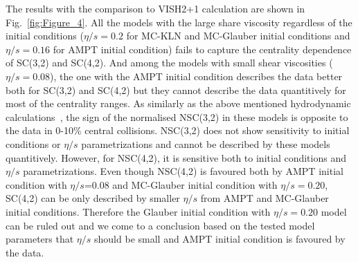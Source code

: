\documentclass[ALICE,manyauthors]{cernphprep}
\begin{document}
The results with the comparison to VISH2+1 calculation are shown in Fig.~\ref{fig:Figure_4}.  All the models with the large share viscosity regardless of the initial conditions ($\eta/s=0.2$ for MC-KLN and MC-Glauber initial conditions and $\eta/s=0.16$ for AMPT initial condition) fails to capture the centrality dependence of SC(3,2) and SC(4,2). 
And among the models with small shear viscosities ($\eta/s=0.08$), the one with the AMPT initial condition describes the data better both for SC(3,2) and SC(4,2) but they cannot describe the data quantitively for most of the centrality ranges.
As similarly as the above mentioned hydrodynamic calculations~\cite{Niemi:2015qia}, the sign of the normalised NSC(3,2) in these models is opposite to the data in 0-10\% central collisions. NSC(3,2) does not show sensitivity to initial conditions or $\eta/s$ parametrizations and cannot be described by these models quantitively.
However, for NSC(4,2), it is sensitive both to initial conditions and $\eta/s$ parametrizations.
Even though NSC(4,2) is favoured both by AMPT initial condition with $\eta/s$=0.08 and MC-Glauber initial condition with $\eta/s=0.20$,
SC(4,2) can be only described by smaller $\eta/s$ from AMPT and MC-Glauber initial conditions. Therefore the Glauber initial condition with $\eta/s=0.20$ model can be ruled out and we come to a conclusion based on the tested model parameters that $\eta/s$ should be small and AMPT initial condition is favoured by the data.
\end{document}
